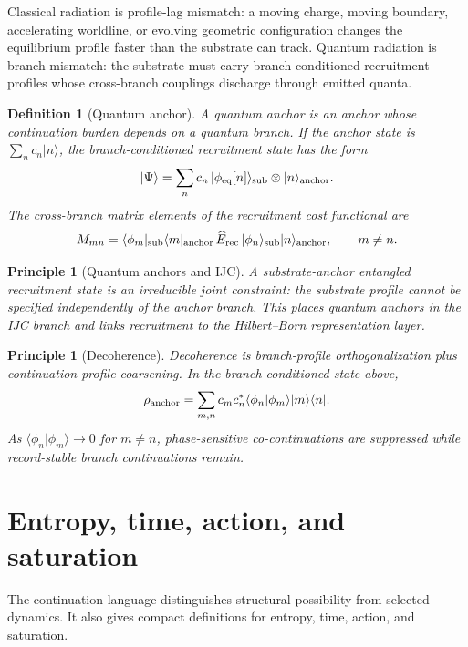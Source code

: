 \documentclass[11pt]{article}
\newtheorem{definition}[theorem]{Definition}
\newtheorem{principle}[theorem]{Principle}
\theoremstyle{remark}
\begin{document}
Classical radiation is profile-lag mismatch: a moving charge, moving boundary, accelerating worldline, or evolving geometric configuration changes the equilibrium profile faster than the substrate can track.  Quantum radiation is branch mismatch: the substrate must carry branch-conditioned recruitment profiles whose cross-branch couplings discharge through emitted quanta.

\begin{definition}[Quantum anchor]
A quantum anchor is an anchor whose continuation burden depends on a quantum branch.  If the anchor state is \(\sum_n c_n|n\rangle\), the branch-conditioned recruitment state has the form
\[
        |\Psi\rangle
        =
        \sum_n c_n\,|\phi_{\rm eq}[n]\rangle_{\rm sub}\otimes |n\rangle_{\rm anchor}.
\]
The cross-branch matrix elements of the recruitment cost functional are
\[
        M_{mn}
        =
        \langle \phi_m|_{\rm sub}\langle m|_{\rm anchor}\,\widehat E_{\rm rec}\,
        |\phi_n\rangle_{\rm sub}|n\rangle_{\rm anchor},
        \qquad m\ne n.
\]
\end{definition}

\begin{principle}[Quantum anchors and IJC]
A substrate-anchor entangled recruitment state is an irreducible joint constraint: the substrate profile cannot be specified independently of the anchor branch.  This places quantum anchors in the IJC branch and links recruitment to the Hilbert--Born representation layer.
\end{principle}

\begin{principle}[Decoherence]
Decoherence is branch-profile orthogonalization plus continuation-profile coarsening.  In the branch-conditioned state above,
\[
        \rho_{\rm anchor}
        =
        \sum_{m,n}c_m c_n^*\langle \phi_n|\phi_m\rangle |m\rangle\langle n|.
\]
As \(\langle\phi_n|\phi_m\rangle\to0\) for \(m\ne n\), phase-sensitive co-continuations are suppressed while record-stable branch continuations remain.
\end{principle}

\section{Entropy, time, action, and saturation}

The continuation language distinguishes structural possibility from selected dynamics.  It also gives compact definitions for entropy, time, action, and saturation.
\end{document}
